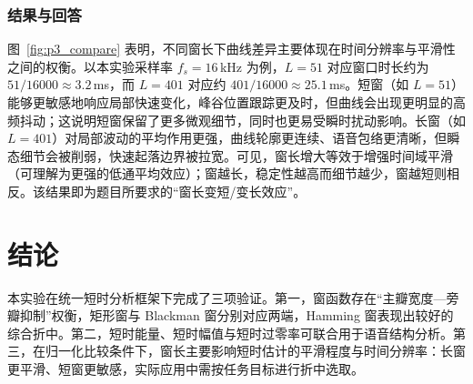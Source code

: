 \documentclass[12pt,a4paper]{ctexart}
\begin{document}
\subsubsection*{结果与回答}
图~\ref{fig:p3_compare} 表明，不同窗长下曲线差异主要体现在时间分辨率与平滑性之间的权衡。以本实验采样率 $f_s=16$\,kHz 为例，$L=51$ 对应窗口时长约为 $51/16000\approx3.2$\,ms，而 $L=401$ 对应约 $401/16000\approx25.1$\,ms。短窗（如 $L=51$）能够更敏感地响应局部快速变化，峰谷位置跟踪更及时，但曲线会出现更明显的高频抖动；这说明短窗保留了更多微观细节，同时也更易受瞬时扰动影响。长窗（如 $L=401$）对局部波动的平均作用更强，曲线轮廓更连续、语音包络更清晰，但瞬态细节会被削弱，快速起落边界被拉宽。可见，窗长增大等效于增强时间域平滑（可理解为更强的低通平均效应）；窗越长，稳定性越高而细节越少，窗越短则相反。该结果即为题目所要求的“窗长变短/变长效应”。

\section{结论}
本实验在统一短时分析框架下完成了三项验证。第一，窗函数存在“主瓣宽度—旁瓣抑制”权衡，矩形窗与 Blackman 窗分别对应两端，Hamming 窗表现出较好的综合折中。第二，短时能量、短时幅值与短时过零率可联合用于语音结构分析。第三，在归一化比较条件下，窗长主要影响短时估计的平滑程度与时间分辨率：长窗更平滑、短窗更敏感，实际应用中需按任务目标进行折中选取。
\end{document}
